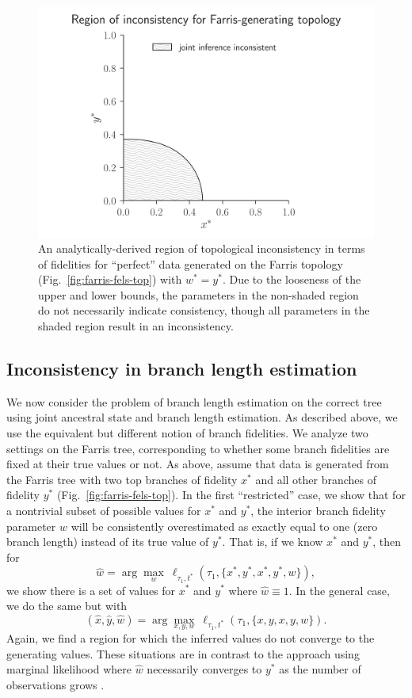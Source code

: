 \documentclass{article}
\begin{document}
\begin{figure}
\centering
\includegraphics[width=\textwidth]{topology-inconsistency-inkscape}
\caption{
    An analytically-derived region of topological inconsistency in terms of fidelities for ``perfect'' data generated on the Farris topology (Fig.~\ref{fig:farris-fels-top}) with $w^* = y^*$.
    Due to the looseness of the upper and lower bounds, the parameters in the non-shaded region do not necessarily indicate consistency, though all parameters in the shaded region result in an inconsistency.
}
\label{fig:inconsistency-farris}
\end{figure}

\subsection*{Inconsistency in branch length estimation}

We now consider the problem of branch length estimation on the correct tree using joint ancestral state and branch length estimation.
As described above, we use the equivalent but different notion of branch fidelities.
We analyze two settings on the Farris tree, corresponding to whether some branch fidelities are fixed at their true values or not.
As above, assume that data is generated from the Farris tree with two top branches of fidelity $x^*$ and all other branches of fidelity $y^*$ (Fig.~\ref{fig:farris-fels-top}).
In the first ``restricted'' case, we show that for a nontrivial subset of possible values for $x^*$ and $y^*$, the interior branch fidelity parameter $w$ will be consistently overestimated as exactly equal to one (zero branch length) instead of its true value of $y^*$.
That is, if we know $x^*$ and $y^*$, then for
$$
\hat{w} = \arg\max_{w} \ \ell_{\tau_1,t^*}(\tau_1, \{x^*,y^*,x^*,y^*,w\}),
$$
we show there is a set of values for $x^*$ and $y^*$ where $\hat{w}\equiv 1$.
In the general case, we do the same but with
$$
(\hat{x}, \hat{y}, \hat{w}) = \arg\max_{x,y,w} \ \ell_{\tau_1,t^*}(\tau_1, \{x,y,x,y,w\}).
$$
Again, we find a region for which the inferred values do not converge to the generating values.
These situations are in contrast to the approach using marginal likelihood where $\hat{w}$ necessarily converges to $y^*$ as the number of observations grows \cite{RoyChoudhury2015-ta}.
\end{document}
